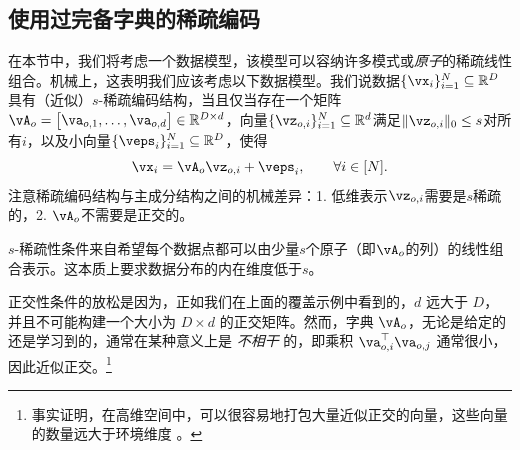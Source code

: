 \documentclass[../../book-main.tex]{subfiles}
\begin{document}


\subsection{使用过完备字典的稀疏编码}

在本节中，我们将考虑一个数据模型，该模型可以容纳许多模式或\textit{原子}的稀疏线性组合。机械上，这表明我们应该考虑以下数据模型。我们说数据\(\{\vx_{i}\}_{i = 1}^{N} \subseteq \R^{D}\)具有（近似）\(s\)-稀疏编码结构，当且仅当存在一个矩阵\(\vA_{o} = \mat{\va_{o, 1}, \dots, \va_{o, d}} \in \R^{D \times d}\)，向量\(\{\vz_{o, i}\}_{i = 1}^{N} \subseteq \R^{d}\)满足\(\norm{\vz_{o, i}}_{0} \leq s\)对所有\(i\)，以及小向量\(\{\veps_{i}\}_{i = 1}^{N} \subseteq \R^{D}\)，使得
\begin{equation}\label{eq:vectorized_sparse_dl_dgp}
    \vx_{i} = \vA_{o}\vz_{o, i} + \veps_{i}, \qquad \forall i \in [N].
\end{equation}
注意稀疏编码结构与主成分结构之间的机械差异：1. 低维表示\(\vz_{o, i}\)需要是\(s\)稀疏的，2. \(\vA_{o}\)不需要是正交的。

\(s\)-稀疏性条件来自希望每个数据点都可以由少量\(s\)个原子（即\(\vA_o\)的列）的线性组合表示。这本质上要求数据分布的内在维度低于\(s\)。

正交性条件的放松是因为，正如我们在上面的覆盖示例中看到的，\(d\) 远大于 \(D\)，并且不可能构建一个大小为 \(D \times d\) 的正交矩阵。然而，字典 \(\vA_{o}\)，无论是给定的还是学习到的，通常在某种意义上是 \textit{不相干} 的，即乘积 \(\va_{o, i}^{\top}\va_{o, j}\) 通常很小，因此近似正交。\footnote{事实证明，在高维空间中，可以很容易地打包大量近似正交的向量，这些向量的数量远大于环境维度 \cite{Wright-Ma-2022}。}
\end{document}
